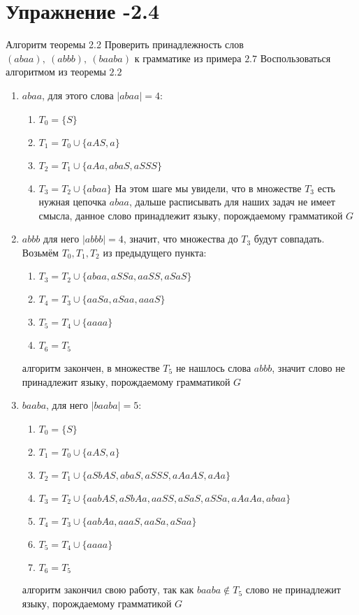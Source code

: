 \documentclass[12pt, a4paper, oneside]{memoir}
\begin{document}
\section*{Упражнение -2.4}
\begin{solution}
    {Алгоритм теоремы 2.2}
    {Проверить принадлежность слов $(abaa),\ (abbb),\ (baaba) $ к грамматике из примера $2.7$}
    {Воспользоваться алгоритмом из теоремы $2.2$}
    \begin{enumerate}
        \item $abaa$, для этого слова $|abaa| = 4$:
              \begin{enumerate}
                  \item $T_0 = \{S\}$
                  \item $T_1 = T_0 \cup \{aAS, a\}$
                  \item $T_2 = T_1 \cup \{aAa, abaS, aSSS\}$
                  \item $T_3 = T_2 \cup \{abaa\}$ На этом шаге мы увидели, что в множестве $T_3$ есть нужная цепочка $abaa$, дальше расписывать для наших задач не имеет смысла, данное слово принадлежит языку, порождаемому грамматикой $G$
              \end{enumerate}
        \item $abbb$ для него $|abbb| = 4$, значит, что множества до $T_3$ будут совпадать. Возьмём $T_0, T_1, T_2$ из предыдущего пункта:
              \begin{enumerate}
                  \item $T_3 = T_2 \cup \{abaa, aSSa, aaSS, aSaS\}$
                  \item $T_4 = T_3 \cup\{aaSa, aSaa, aaaS\}$
                  \item $T_5 = T_4 \cup \{aaaa\}$
                  \item $T_6 = T_5$
              \end{enumerate}
              алгоритм закончен, в множестве $T_5$ не нашлось слова $abbb$, значит слово не принадлежит языку, порождаемому грамматикой $G$
        \item $baaba$, для него $|baaba| = 5$:
              \begin{enumerate}
                  \item $T_0 = \{S\}$
                  \item $T_1 = T_0 \cup \{aAS, a\}$
                  \item $T_2 = T_1 \cup \{aSbAS, abaS, aSSS, aAaAS, aAa\}$
                  \item $T_3 = T_2 \cup \{aabAS, aSbAa, aaSS, aSaS, aSSa, aAaAa, abaa\}$
                  \item $T_4 = T_3 \cup \{aabAa, aaaS, aaSa, aSaa\}$
                  \item $T_5 = T_4 \cup \{aaaa\}$
                  \item $T_6 = T_5$
              \end{enumerate}
              алгоритм закончил свою работу, так как $baaba \notin T_5$ слово не принадлежит языку, порождаемому грамматикой $G$
    \end{enumerate}

\end{solution}
\end{document}
